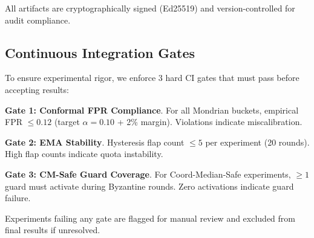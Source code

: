 All artifacts are cryptographically signed (Ed25519) and version-controlled for audit compliance.


\subsection{Continuous Integration Gates}
\label{sec:ci_gates}

To ensure experimental rigor, we enforce 3 hard CI gates that must pass before accepting results:

\textbf{Gate 1: Conformal FPR Compliance}. For all Mondrian buckets, empirical FPR $\leq 0.12$ (target $\alpha = 0.10$ + 2\% margin). Violations indicate miscalibration.

\textbf{Gate 2: EMA Stability}. Hysteresis flap count $\leq 5$ per experiment (20 rounds). High flap counts indicate quota instability.

\textbf{Gate 3: CM-Safe Guard Coverage}. For Coord-Median-Safe experiments, $\geq 1$ guard must activate during Byzantine rounds. Zero activations indicate guard failure.

Experiments failing any gate are flagged for manual review and excluded from final results if unresolved.


%
%
%
